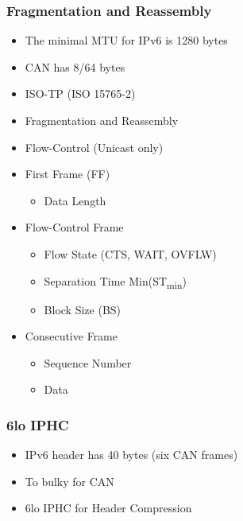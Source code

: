 \documentclass[aspectratio=169]{beamer}
\begin{document}
\begin{frame}
	\frametitle{Fragmentation and Reassembly}
	\begin{itemize}
		\item The minimal MTU for IPv6 is 1280 bytes
		\item CAN has 8/64 bytes
		\item ISO-TP (ISO 15765-2)
		\item Fragmentation and Reassembly
		\item Flow-Control (Unicast only)
	\end{itemize}
\end{frame}

\begin{frame}
	\begin{minipage}[t]{0.6\textwidth}
		\begin{itemize}
			\item First Frame (FF)
				\begin{itemize}
					\item Data Length
				\end{itemize}
			\item Flow-Control Frame
				\begin{itemize}
					\item Flow State (CTS, WAIT, OVFLW)
					\item Separation Time Min(ST\textsubscript{min})
					\item Block Size (BS)
				\end{itemize}
			\item Consecutive Frame
				\begin{itemize}
					\item Sequence Number
					\item Data
				\end{itemize}
		\end{itemize}
	\end{minipage}
	\begin{minipage}[t]{0.39\textwidth}
		
	\end{minipage}
\end{frame}

\begin{frame}
	\frametitle{6lo IPHC}
	\begin{itemize}
		\item IPv6 header has 40 bytes (six CAN frames)
		\item To bulky for CAN
		\item 6lo IPHC for Header Compression
	\end{itemize}
\end{frame}
\end{document}
